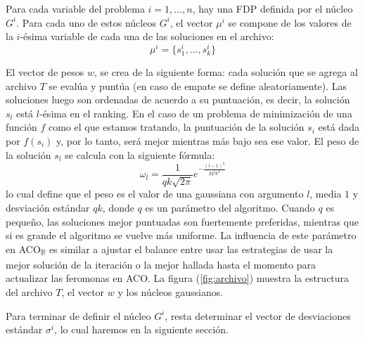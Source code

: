 \documentclass{llncs}
\begin{document}
	Para cada variable del problema $i = 1, \dots, n$, hay una FDP definida por el núcleo $G^i$. Para cada uno de estos núcleos $G^i$,
	el vector $\mu^i$ se compone de los valores de la $i$-ésima variable de cada una de las soluciones en el archivo:
	\begin{equation}
	\mu^i = \{s^i_1, \dots, s^i_k \}
	\end{equation}
	
	El vector de pesos $w$, se crea de la siguiente forma: cada solución que se agrega al archivo $T$ se evalúa y puntúa (en caso de
	empate se define aleatoriamente). Las soluciones luego son ordenadas de acuerdo a su puntuación, es decir, la solución $s_l$ está
	$l$-ésima en el ranking. En el caso de un problema de minimización de una función $f$ como el que estamos tratando,  la puntuación
	de la solución $s_i$ está dada por $f(s_i)$ y, por lo tanto, será mejor mientras más bajo sea ese valor.
	El peso de la solución $s_l$ se calcula con la siguiente fórmula:
	\begin{equation}
	\label{eq:vectorPesos}
	\omega_l = \frac{1}{qk\sqrt{2\pi}}e^{-\frac{(l-1)^2}{2q^2k^2}}
	\end{equation}
	lo cual define que el peso es el valor de una gaussiana con argumento $l$, media $1$ y desviación estándar $qk$, donde $q$ es
	un parámetro del algoritmo. Cuando $q$ es pequeño, las soluciones mejor puntuadas son fuertemente preferidas, mientras que si es
	grande el algoritmo se vuelve más uniforme. La influencia de este parámetro en ACO\textsubscript{$\mathbb{R}$} es similar a ajustar el balance entre
	usar las estrategias de usar la mejor solución de la iteración o la mejor hallada hasta el momento para actualizar las feromonas en
	ACO. La figura (\ref{fig:archivo}) muestra la estructura del archivo $T$, el vector $w$ y los núcleos gaussianos.
	
	Para terminar de definir el núcleo $G^i$, resta determinar el vector de desviaciones estándar $\sigma^i$, lo cual haremos en la siguiente
	sección.
	
\end{document}
